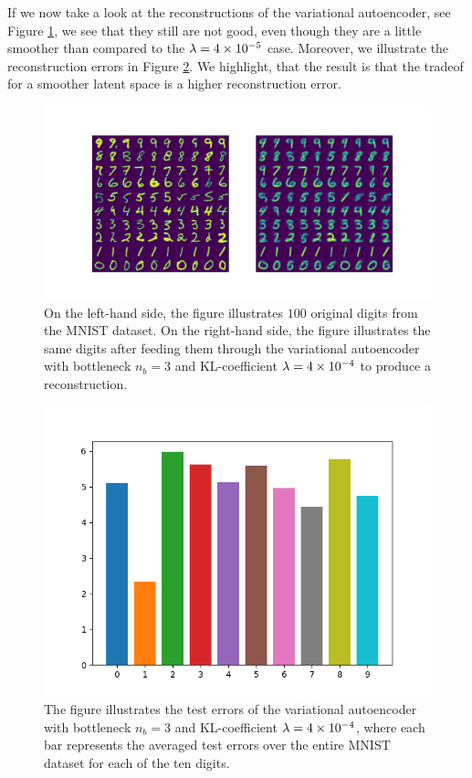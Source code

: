If we now take a look at the reconstructions of the variational autoencoder, see Figure \ref{fig:convolutional_VAE_snd_KL_4e-4_5k_epochs_3D_inference}, we see that they still are not good, even though they are a little smoother than compared to the $\lambda = \num{4e-5}$ case.
Moreover, we illustrate the reconstruction errors in Figure \ref{fig:convolutional_VAE_snd_KL_4e-4_5k_epochs_3D_errors}. We highlight, that the result is that the tradeof for a smoother latent space is a higher reconstruction error.


\begin{figure}
\begin{center}
      \includegraphics[trim = 15mm 10mm 15mm 15mm, clip, width=\linewidth]{convolutional_VAE_snd_KL_4e-4_5k_epochs_3D_inference}
\end{center}
\caption{On the left-hand side, the figure illustrates $100$ original digits from the MNIST dataset. On the right-hand side, the figure illustrates the same digits after feeding them through the variational autoencoder with bottleneck $n_b=3$ and KL-coefficient $\lambda=\num{4e-4}$ to produce a reconstruction.}\label{fig:convolutional_VAE_snd_KL_4e-4_5k_epochs_3D_inference}
\end{figure}


\begin{figure}
\begin{center}
      \includegraphics[width=0.49\linewidth]{convolutional_VAE_snd_KL_4e-4_5k_epochs_3D_errors}
\end{center}
\caption{The figure illustrates the test errors of the variational autoencoder with bottleneck $n_b=3$ and KL-coefficient $\lambda = \num{4e-4}$, where each bar represents the averaged test errors over the entire MNIST dataset for each of the ten digits.}\label{fig:convolutional_VAE_snd_KL_4e-4_5k_epochs_3D_errors}
\end{figure}


